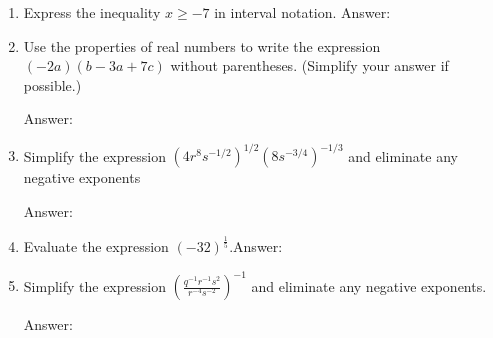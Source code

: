 \documentclass[11pt]{article}
\begin{document}
\begin{enumerate}
\item Express the inequality $x \geq -7$ in interval notation. \hfill Answer: \underline{\hspace{2in}}
\vspace{1in}

\item Use the properties of real numbers to write the expression $(-2a)(b-3a+7c)$ without parentheses. (Simplify your answer if possible.)\\
\begin{flushright}{Answer: \underline{\hspace{2in}}}\end{flushright}

\vfill



\item Simplify the expression $ (4r^8s^{-1/2})^{1/2}(8s^{-3/4})^{-1/3}$ and eliminate any negative exponents \\
\begin{flushright}{Answer: \underline{\hspace{2in}}}\end{flushright}

\vspace{1in}

\item Evaluate the expression $(-32)^{\frac{1}{5}}.$\hfill Answer: \underline{\hspace{2in}}\\
\vspace{0.5in}


\item Simplify the expression $\left( \frac{q^{-1}r^{-1}s^{2}}{r^{-4}s^{-2}}\right)^{-1}  $ and eliminate any negative exponents.\\
\begin{flushright}{Answer: \underline{\hspace{2in}}}\end{flushright}


\end{enumerate}
\end{document}
